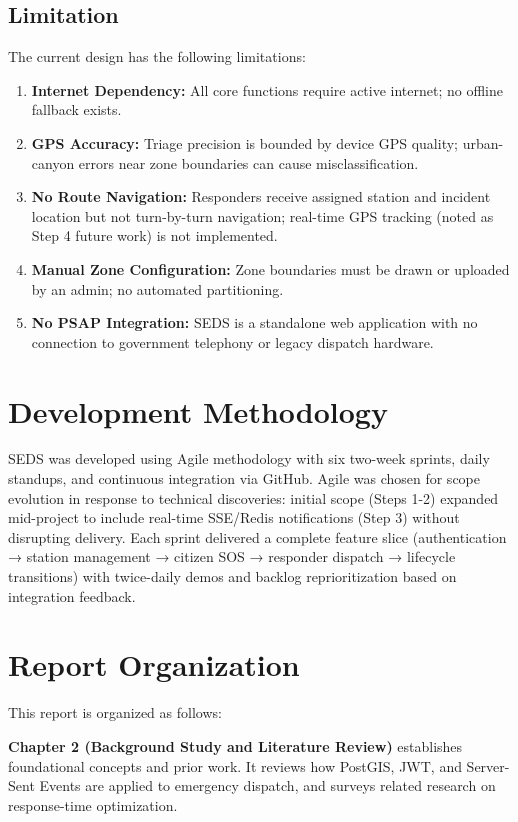 \subsection{Limitation}
The current design has the following limitations:
\begin{enumerate}
  \setlength\itemsep{10pt}
  \item \textbf{Internet Dependency:} All core functions require active internet; no offline fallback exists.
  \item \textbf{GPS Accuracy:} Triage precision is bounded by device GPS quality; urban-canyon errors near zone boundaries can cause misclassification.
  \item \textbf{No Route Navigation:} Responders receive assigned station and incident location but not turn-by-turn navigation; real-time GPS tracking (noted as Step 4 future work) is not implemented.
  \item \textbf{Manual Zone Configuration:} Zone boundaries must be drawn or uploaded by an admin; no automated partitioning.
  \item \textbf{No PSAP Integration:} SEDS is a standalone web application with no connection to government telephony or legacy dispatch hardware.
\end{enumerate}

\section{Development Methodology}
SEDS was developed using Agile methodology with six two-week sprints, daily standups, and continuous integration via GitHub. Agile was chosen for scope evolution in response to technical discoveries: initial scope (Steps 1-2) expanded mid-project to include real-time SSE/Redis notifications (Step 3) without disrupting delivery. Each sprint delivered a complete feature slice (authentication → station management → citizen SOS → responder dispatch → lifecycle transitions) with twice-daily demos and backlog reprioritization based on integration feedback.

\section{Report Organization}
This report is organized as follows:

\textbf{Chapter 2 (Background Study and Literature Review)} establishes foundational concepts and prior work. It reviews how PostGIS, JWT, and Server-Sent Events are applied to emergency dispatch, and surveys related research on response-time optimization.


